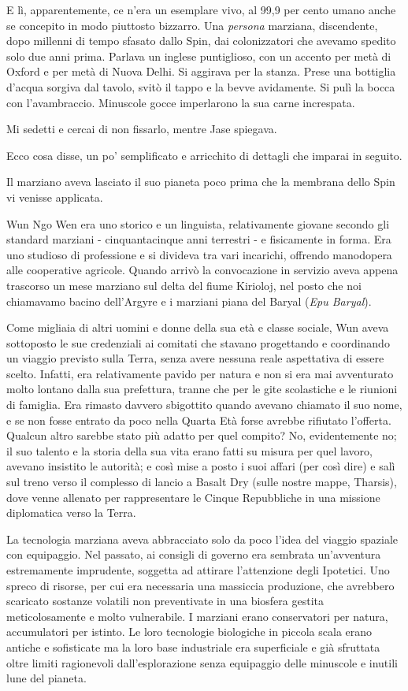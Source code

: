 E lì, apparentemente, ce n'era un esemplare vivo, al 99,9 per cento
umano anche se concepito in modo piuttosto bizzarro. Una \emph{persona}
marziana, discendente, dopo millenni di tempo sfasato dallo Spin, dai
colonizzatori che avevamo spedito solo due anni prima. Parlava un
inglese puntiglioso, con un accento per metà di Oxford e per metà di
Nuova Delhi. Si aggirava per la stanza. Prese una bottiglia d'acqua
sorgiva dal tavolo, svitò il tappo e la bevve avidamente. Si pulì la
bocca con l'avambraccio. Minuscole gocce imperlarono la sua carne
increspata.

Mi sedetti e cercai di non fissarlo, mentre Jase spiegava.

Ecco cosa disse, un po' semplificato e arricchito di dettagli che
imparai in seguito.

\separatorefiori

Il marziano aveva lasciato il suo pianeta poco prima che la membrana
dello Spin vi venisse applicata.

Wun Ngo Wen era uno storico e un linguista, relativamente giovane
secondo gli standard marziani - cinquantacinque anni terrestri - e
fisicamente in forma. Era uno studioso di professione e si divideva tra
vari incarichi, offrendo manodopera alle cooperative agricole. Quando
arrivò la convocazione in servizio aveva appena trascorso un mese
marziano sul delta del fiume Kirioloj, nel posto che noi chiamavamo
bacino dell'Argyre e i marziani piana del Baryal (\emph{Epu Baryal}).

Come migliaia di altri uomini e donne della sua età e classe sociale,
Wun aveva sottoposto le sue credenziali ai comitati che stavano
progettando e coordinando un viaggio previsto sulla Terra, senza avere
nessuna reale aspettativa di essere scelto. Infatti, era relativamente
pavido per natura e non si era mai avventurato molto lontano dalla sua
prefettura, tranne che per le gite scolastiche e le riunioni di
famiglia. Era rimasto davvero sbigottito quando avevano chiamato il suo
nome, e se non fosse entrato da poco nella Quarta Età forse avrebbe
rifiutato l'offerta. Qualcun altro sarebbe stato più adatto per quel
compito? No, evidentemente no; il suo talento e la storia della sua vita
erano fatti su misura per quel lavoro, avevano insistito le autorità; e
così mise a posto i suoi affari (per così dire) e salì sul treno verso
il complesso di lancio a Basalt Dry (sulle nostre mappe, Tharsis), dove
venne allenato per rappresentare le Cinque Repubbliche in una missione
diplomatica verso la Terra.

La tecnologia marziana aveva abbracciato solo da poco l'idea del viaggio
spaziale con equipaggio. Nel passato, ai consigli di governo era
sembrata un'avventura estremamente imprudente, soggetta ad attirare
l'attenzione degli Ipotetici. Uno spreco di risorse, per cui era
necessaria una massiccia produzione, che avrebbero scaricato sostanze
volatili non preventivate in una biosfera gestita meticolosamente e
molto vulnerabile. I marziani erano conservatori per natura,
accumulatori per istinto. Le loro tecnologie biologiche in piccola scala
erano antiche e sofisticate ma la loro base industriale era superficiale
e già sfruttata oltre limiti ragionevoli dall'esplorazione senza
equipaggio delle minuscole e inutili lune del pianeta.

